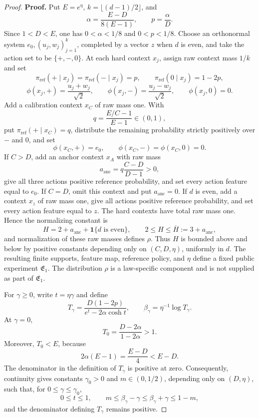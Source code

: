 \documentclass{article}
\begin{document}
\begin{proof}
\textbf{Proof.} Put \(E=e^\eta\), \(k=\lfloor(d-1)/2\rfloor\), and
\[
\alpha=\frac{E-D}{8(E-1)},\qquad p=\frac{\alpha}{D}.
\]
Since \(1<D<E\), one has \(0<\alpha<1/8\) and \(0<p<1/8\). Choose an orthonormal system \(e_0,(u_j,w_j)_{j=1}^k\), completed by a vector \(z\) when \(d\) is even, and take the action set to be \(\{+,-,0\}\). At each hard context \(x_j\), assign raw context mass \(1/k\) and set
\[
\pi_{\mathrm{ref}}(+\mid x_j)=\pi_{\mathrm{ref}}(-\mid x_j)=p,\qquad
\pi_{\mathrm{ref}}(0\mid x_j)=1-2p,
\]
\[
\phi(x_j,+)=\frac{u_j+w_j}{\sqrt2},\qquad
\phi(x_j,-)=\frac{u_j-w_j}{\sqrt2},\qquad
\phi(x_j,0)=0.
\]
Add a calibration context \(x_C\) of raw mass one. With
\[
q=\frac{E/C-1}{E-1}\in(0,1),
\]
put \(\pi_{\mathrm{ref}}(+\mid x_C)=q\), distribute the remaining probability strictly positively over \(-\) and \(0\), and set
\[
\phi(x_C,+)=e_0,\qquad \phi(x_C,-)=\phi(x_C,0)=0.
\]
If \(C>D\), add an anchor context \(x_A\) with raw mass
\[
a_{\mathrm{anc}}=q\frac{C-D}{D-1}>0,
\]
give all three actions positive reference probability, and set every action feature equal to \(e_0\). If \(C=D\), omit this context and put \(a_{\mathrm{anc}}=0\). If \(d\) is even, add a context \(x_z\) of raw mass one, give all actions positive reference probability, and set every action feature equal to \(z\). The hard contexts have total raw mass one. Hence the normalizing constant is
\[
H=2+a_{\mathrm{anc}}+\mathbf 1\{d\text{ is even}\},
\qquad 2\le H\le \overline H:=3+a_{\mathrm{anc}},
\]
and normalization of these raw masses defines \(\rho\). Thus \(H\) is bounded above and below by positive constants depending only on \((C,D,\eta)\), uniformly in \(d\). The resulting finite supports, feature map, reference policy, and \(\eta\) define a fixed public experiment \(\mathfrak E_1\). The distribution \(\rho\) is a law-specific component and is not supplied as part of \(\mathfrak E_1\).

For \(\gamma\ge0\), write \(t=\eta\gamma\) and define
\[
T_\gamma=\frac{D(1-2p)}{e^t-2\alpha\cosh t},
\qquad
\beta_\gamma=\eta^{-1}\log T_\gamma.
\]
At \(\gamma=0\),
\[
T_0=\frac{D-2\alpha}{1-2\alpha}>1.
\]
Moreover, \(T_0<E\), because
\[
2\alpha(E-1)=\frac{E-D}{4}<E-D.
\]
The denominator in the definition of \(T_\gamma\) is positive at zero. Consequently, continuity gives constants \(\gamma_0>0\) and \(m\in(0,1/2)\), depending only on \((D,\eta)\), such that, for \(0\le\gamma\le\gamma_0\),
\[
0\le t\le1,\qquad
m\le\beta_\gamma-\gamma\le\beta_\gamma+\gamma\le1-m,
\]
and the denominator defining \(T_\gamma\) remains positive.


\end{proof}
\end{document}
